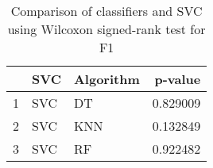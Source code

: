 \begin{table}
\footnotesize
\caption{Comparison of classifiers and SVC using Wilcoxon signed-rank test for F1}
\label{tab:SVC wilcoxon F1 comparison}
\begin{tabular}{lllr}
\hline
 & SVC & Algorithm & p-value \\
\hline
1 & SVC & DT & 0.829009 \\
2 & SVC & KNN & 0.132849 \\
3 & SVC & RF & 0.922482 \\
\hline
\end{tabular}
\end{table}
